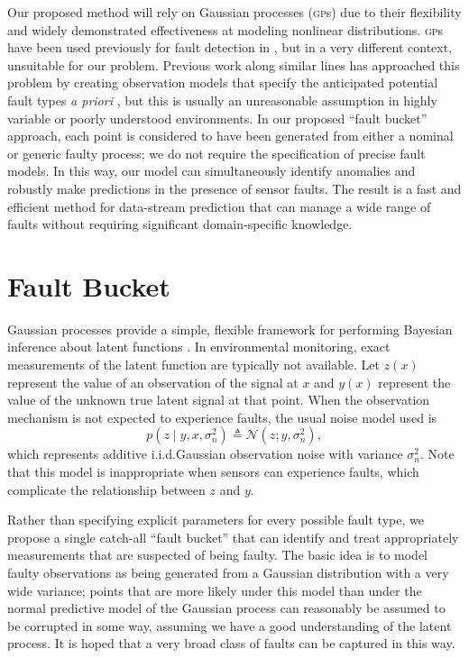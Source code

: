 \documentclass{article}
\newcommand{\deq}{\ensuremath{\triangleq}}
\newcommand{\given}{\ensuremath{\mid}}
\newcommand{\cm}[1]{\ensuremath{\mathcal{#1}}}
\newcommand{\acro}[1]{\textsc{#1}}
\begin{document}
Our proposed method will rely on Gaussian processes (\acro{gp}s) due
to their flexibility and widely demonstrated effectiveness at modeling
nonlinear distributions. \acro{gp}s have been used previously for
fault detection in \citep{Eciolaza2001}, but in a very different
context, unsuitable for our problem. Previous work along similar lines
has approached this problem by creating observation models that
specify
the anticipated potential fault types \textit{a priori}
\citep{garnettosborne}, but this is usually an unreasonable assumption
in highly variable or poorly understood environments. 
In our proposed  ``fault bucket'' approach, each point is considered
to have been generated from either a nominal or generic faulty process; we do not require the specification of precise fault models. In
this way, our model can simultaneously identify anomalies and robustly
make predictions in the presence of sensor faults. 
The result is a fast and efficient method for data-stream prediction
that can manage a
wide range of faults without requiring significant
domain-specific knowledge.

\section{Fault Bucket}\label{bucket}
Gaussian processes provide a simple, flexible framework for performing
Bayesian inference about latent functions \citep{gpml}.  In
environmental monitoring, exact measurements of the latent function
are typically not available.
Let $z(x)$ represent the value of an observation of the signal at $x$
and $y(x)$ represent the value of the unknown true latent signal at
that point.  When the observation mechanism is not expected to
experience faults, the usual noise model used is
\begin{equation}\label{iidnoise}
 p(z \given y, x, \sigma_n^2)
 \deq
 \cm{N}(z; y, \sigma_n^2),
\end{equation}
which represents additive i.i.d.\space Gaussian observation noise with
variance $\sigma_n^2$. Note that this model is inappropriate when
sensors can experience faults, which complicate the relationship
between $z$ and $y$.

Rather than specifying explicit parameters for every possible fault
type, we propose a single catch-all ``fault bucket'' that can identify
and treat appropriately measurements that are suspected of being
faulty.  The basic idea is to model faulty observations as being
generated from a Gaussian distribution with a very wide variance;
points that are more likely under this model than under the normal
predictive model of the Gaussian process can reasonably be assumed to
be corrupted in some way, assuming we have a good understanding of the
latent process. It is hoped that a very broad class of faults can be
captured in this way.
\end{document}
